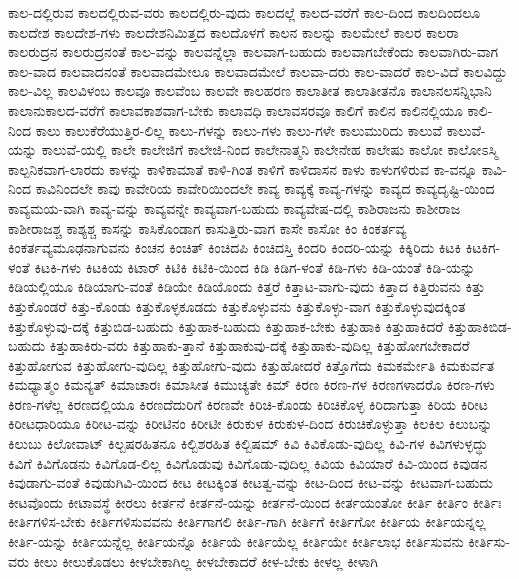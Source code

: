 {ಕಾಲ-ದಲ್ಲಿರುವ
ಕಾಲದಲ್ಲಿರುವ-ವರು
ಕಾಲದಲ್ಲಿರು-ವುದು
ಕಾಲದಲ್ಲೆ
ಕಾಲದ-ವರೆಗೆ
ಕಾಲ-ದಿಂದ
ಕಾಲದಿಂದಲೂ
ಕಾಲದೇಶ
ಕಾಲದೇಶ-ಗಳು
ಕಾಲದೇಶನಿಮಿತ್ತದ
ಕಾಲದೊಳಗೆ
ಕಾಲನ
ಕಾಲನ್ನು
ಕಾಲಮೇಲೆ
ಕಾಲರ
ಕಾಲರಾ
ಕಾಲರುದ್ರನ
ಕಾಲರುದ್ರನಂತೆ
ಕಾಲ-ವನ್ನು
ಕಾಲವನ್ನೆಲ್ಲಾ
ಕಾಲವಾಗ-ಬಹುದು
ಕಾಲವಾಗಬೇಕೆಂದು
ಕಾಲವಾಗಿರು-ವಾಗ
ಕಾಲ-ವಾದ
ಕಾಲವಾದನಂತೆ
ಕಾಲವಾದಮೇಲೂ
ಕಾಲವಾದಮೇಲೆ
ಕಾಲವಾ-ದರು
ಕಾಲ-ವಾದರೆ
ಕಾಲ-ವಿದೆ
ಕಾಲವಿದ್ದು
ಕಾಲ-ವಿಲ್ಲ
ಕಾಲವಿಳಂಬ
ಕಾಲವೂ
ಕಾಲವೆಂಬ
ಕಾಲವೇ
ಕಾಲಹರಣ
ಕಾಲಾತೀತ
ಕಾಲಾತೀತನೊ
ಕಾಲಾನಲಸನ್ನಿಭಾನಿ
ಕಾಲಾನುಕಾಲದ-ವರೆಗೆ
ಕಾಲಾವಕಾಶವಾಗ-ಬೇಕು
ಕಾಲಾವಧಿ
ಕಾಲಾವಸರವೂ
ಕಾಲಿಗೆ
ಕಾಲಿನ
ಕಾಲಿನಲ್ಲಿಯೂ
ಕಾಲಿ-ನಿಂದ
ಕಾಲು
ಕಾಲುಕೆರೆಯುತ್ತಿರ-ಲಿಲ್ಲ
ಕಾಲು-ಗಳನ್ನು
ಕಾಲು-ಗಳು
ಕಾಲು-ಗಳೇ
ಕಾಲುಮುರಿದು
ಕಾಲುವೆ
ಕಾಲುವೆ-ಯನ್ನು
ಕಾಲುವೆ-ಯಲ್ಲಿ
ಕಾಲೇ
ಕಾಲೇಜಿಗೆ
ಕಾಲೇಜಿ-ನಿಂದ
ಕಾಲೇನಾತ್ಮನಿ
ಕಾಲೇನೇಹ
ಕಾಲೇಷು
ಕಾಲೋ
ಕಾಲೋಽಸ್ಮಿ
ಕಾಲ್ಪನಿಕವಾಗ-ಲಾರದು
ಕಾಳನ್ನು
ಕಾಳಿಕಾಮಾತೆ
ಕಾಳಿ-ಗಿಂತ
ಕಾಳಿಗೆ
ಕಾಳಿದಾಸನ
ಕಾಳು
ಕಾಳುಗಳಿರುವ
ಕಾ-ವನ್ನೂ
ಕಾವಿ-ನಿಂದ
ಕಾವಿನಿಂದಲೇ
ಕಾವು
ಕಾವೇರಿಯ
ಕಾವೇರಿಯಿಂದಲೇ
ಕಾವ್ಯ
ಕಾವ್ಯಕ್ಕೆ
ಕಾವ್ಯ-ಗಳನ್ನು
ಕಾವ್ಯದ
ಕಾವ್ಯದೃಷ್ಟಿ-ಯಿಂದ
ಕಾವ್ಯಮಯ-ವಾಗಿ
ಕಾವ್ಯ-ವನ್ನು
ಕಾವ್ಯವನ್ನೇ
ಕಾವ್ಯವಾಗ-ಬಹುದು
ಕಾವ್ಯವೇಷ-ದಲ್ಲಿ
ಕಾಶಿರಾಜನು
ಕಾಶೀರಾಜ
ಕಾಶೀರಾಜಶ್ಚ
ಕಾಶ್ಯಶ್ಚ
ಕಾಸನ್ನು
ಕಾಸಿಕೊಂಡಾಗ
ಕಾಸುತ್ತಿರು-ವಾಗ
ಕಾಸೇ
ಕಾಸೋ
ಕಿಂ
ಕಿಂಕರ್ತವ್ಯ
ಕಿಂಕರ್ತವ್ಯಮೂಢನಾಗುವನು
ಕಿಂಚನ
ಕಿಂಚಿತ್
ಕಿಂಚಿದಪಿ
ಕಿಂಚಿದಸ್ತಿ
ಕಿಂದರಿ
ಕಿಂದರಿ-ಯನ್ನು
ಕಿಕ್ಕಿರಿದು
ಕಿಟಕಿ
ಕಿಟಕಿಗ-ಳಂತೆ
ಕಿಟಕಿ-ಗಳು
ಕಿಟಕಿಯ
ಕಿಟಾರ್
ಕಿಟಿಕಿ
ಕಿಟಿಕಿ-ಯಿಂದ
ಕಿಡಿ
ಕಿಡಿಗ-ಳಂತೆ
ಕಿಡಿ-ಗಳು
ಕಿಡಿ-ಯಂತೆ
ಕಿಡಿ-ಯನ್ನು
ಕಿಡಿಯಲ್ಲಿಯೂ
ಕಿಡಿಯಾಗು-ವಂತೆ
ಕಿಡಿಯೇ
ಕಿಡಿಯೊಂದು
ಕಿತ್ತರೆ
ಕಿತ್ತಾಟ-ವಾಗು-ವುದು
ಕಿತ್ತಾದ
ಕಿತ್ತಿರುವನು
ಕಿತ್ತು
ಕಿತ್ತುಕೊಂಡರೆ
ಕಿತ್ತು-ಕೊಂಡು
ಕಿತ್ತುಕೊಳ್ಳಕೂಡದು
ಕಿತ್ತುಕೊಳ್ಳುವನು
ಕಿತ್ತುಕೊಳ್ಳು-ವಾಗ
ಕಿತ್ತುಕೊಳ್ಳುವುದಕ್ಕಿಂತ
ಕಿತ್ತುಕೊಳ್ಳುವು-ದಕ್ಕೆ
ಕಿತ್ತುಬಿಡ-ಬಹುದು
ಕಿತ್ತುಹಾಕ-ಬಹುದು
ಕಿತ್ತುಹಾಕ-ಬೇಕು
ಕಿತ್ತುಹಾಕಿ
ಕಿತ್ತುಹಾಕಿದರೆ
ಕಿತ್ತುಹಾಕಿಬಿಡ-ಬಹುದು
ಕಿತ್ತುಹಾಕಿರು-ವರು
ಕಿತ್ತುಹಾಕು-ತ್ತಾನೆ
ಕಿತ್ತುಹಾಕುವು-ದಕ್ಕೆ
ಕಿತ್ತುಹಾಕು-ವುದಿಲ್ಲ
ಕಿತ್ತುಹೋಗಬೇಕಾದರೆ
ಕಿತ್ತುಹೋಗುವ
ಕಿತ್ತುಹೋಗು-ವುದಿಲ್ಲ
ಕಿತ್ತುಹೋಗು-ವುದು
ಕಿತ್ತುಹೋದರೆ
ಕಿತ್ತೊಗೆದು
ಕಿಮಕರ್ಮೇತಿ
ಕಿಮಕುರ್ವತ
ಕಿಮಧ್ಯಾತ್ಮಂ
ಕಿಮನ್ಯತ್
ಕಿಮಾಚಾರಃ
ಕಿಮಾಸೀತ
ಕಿಮುಚ್ಯತೇ
ಕಿಮ್
ಕಿರಣ
ಕಿರಣ-ಗಳ
ಕಿರಣಗಳಾದರೊ
ಕಿರಣ-ಗಳು
ಕಿರಣ-ಗಳೆಲ್ಲ
ಕಿರಣದಲ್ಲಿಯೂ
ಕಿರಣದೆದುರಿಗೆ
ಕಿರಣವೇ
ಕಿರಿಚಿ-ಕೊಂಡು
ಕಿರಿಚಿಕೊಳ್ಳ
ಕಿರಿದಾಗುತ್ತಾ
ಕಿರಿಯ
ಕಿರೀಟ
ಕಿರೀಟಧಾರಿಯೂ
ಕಿರೀಟ-ವನ್ನು
ಕಿರೀಟಿನಂ
ಕಿರೀಟೀ
ಕಿರುಕುಳ
ಕಿರುಕುಳ-ದಿಂದ
ಕಿರುಚಿಕೊಳ್ಳುತ್ತಾ
ಕಿಲಕಿಲ
ಕಿಲುಬನ್ನು
ಕಿಲುಬು
ಕಿಲೋವಾಟ್
ಕಿಲ್ಬಷರಹಿತನೂ
ಕಿಲ್ಬಿಶರಹಿತ
ಕಿಲ್ಬಿಷಮ್
ಕಿವಿ
ಕಿವಿಕೊಡು-ವುದಿಲ್ಲ
ಕಿವಿ-ಗಳ
ಕಿವಿಗಳುಳ್ಳದ್ಧು
ಕಿವಿಗೆ
ಕಿವಿಗೊಡನು
ಕಿವಿಗೊಡ-ಲಿಲ್ಲ
ಕಿವಿಗೊಡುವು
ಕಿವಿಗೊಡು-ವುದಿಲ್ಲ
ಕಿವಿಯ
ಕಿವಿಯಾರೆ
ಕಿವಿ-ಯಿಂದ
ಕಿವುಡನ
ಕಿವುಡಾಗು-ವಂತೆ
ಕಿವುಡುಗಿವಿ-ಯಿಂದ
ಕೀಟ
ಕೀಟಕ್ಕಿಂತ
ಕೀಟತ್ವ-ವನ್ನು
ಕೀಟ-ದಿಂದ
ಕೀಟ-ವನ್ನು
ಕೀಟವಾಗ-ಬಹುದು
ಕೀಟವೊಂದು
ಕೀಟಾವಸ್ಥೆ
ಕೀರಲು
ಕೀರ್ತನೆ
ಕೀರ್ತನೆ-ಯನ್ನು
ಕೀರ್ತನೆ-ಯಿಂದ
ಕೀರ್ತಯಂತೋ
ಕೀರ್ತಿ
ಕೀರ್ತಿಂ
ಕೀರ್ತಿಃ
ಕೀರ್ತಿಗಳಿಸ-ಬೇಕು
ಕೀರ್ತಿಗಳಿಸುವವನು
ಕೀರ್ತಿಗಾಗಲಿ
ಕೀರ್ತಿ-ಗಾಗಿ
ಕೀರ್ತಿಗೆ
ಕೀರ್ತಿಗೋ
ಕೀರ್ತಿಯ
ಕೀರ್ತಿಯನ್ನಲ್ಲ
ಕೀರ್ತಿ-ಯನ್ನು
ಕೀರ್ತಿಯನ್ನೆಲ್ಲ
ಕೀರ್ತಿಯನ್ನೊ
ಕೀರ್ತಿಯೆ
ಕೀರ್ತಿಯೆಲ್ಲ
ಕೀರ್ತಿಯೇ
ಕೀರ್ತಿಲಾಭ
ಕೀರ್ತಿಸುವನು
ಕೀರ್ತಿಸು-ವರು
ಕೀಲು
ಕೀಲುಕೊಡಲು
ಕೀಳಬೇಕಾಗಿಲ್ಲ
ಕೀಳಬೇಕಾದರೆ
ಕೀಳ-ಬೇಕು
ಕೀಳಲ್ಲ
ಕೀಳಾಗಿ
}
